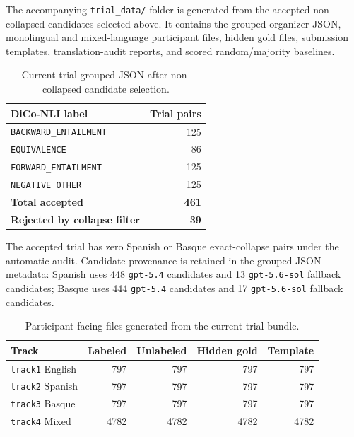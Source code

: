 \documentclass[10pt]{article}
\begin{document}
The accompanying \texttt{trial\_data/} folder is generated from the accepted
non-collapsed candidates selected above.  It contains the grouped organizer JSON,
monolingual and mixed-language participant files, hidden gold files, submission
templates, translation-audit reports, and scored random/majority baselines.

\begin{table}[h]
\centering
\small
\begin{tabular}{lr}
\toprule
DiCo-NLI label & Trial pairs \\
\midrule
\texttt{BACKWARD\_ENTAILMENT} & 125 \\
\texttt{EQUIVALENCE} & 86 \\
\texttt{FORWARD\_ENTAILMENT} & 125 \\
\texttt{NEGATIVE\_OTHER} & 125 \\
\midrule
\textbf{Total accepted} & \textbf{461} \\
\textbf{Rejected by collapse filter} & \textbf{39} \\
\bottomrule
\end{tabular}
\caption{Current trial grouped JSON after non-collapsed candidate selection.}
\label{tab:trial-counts}
\end{table}

The accepted trial has zero Spanish or Basque exact-collapse pairs under the
automatic audit.  Candidate provenance is retained in the grouped JSON metadata:
Spanish uses 448 \texttt{gpt-5.4} candidates and 13 \texttt{gpt-5.6-sol}
fallback candidates; Basque uses 444 \texttt{gpt-5.4} candidates and 17
\texttt{gpt-5.6-sol} fallback candidates.

\begin{table}[h]
\centering
\small
\begin{tabular}{lrrrr}
\toprule
Track & Labeled & Unlabeled & Hidden gold & Template \\
\midrule
\texttt{track1} English & 797 & 797 & 797 & 797 \\
\texttt{track2} Spanish & 797 & 797 & 797 & 797 \\
\texttt{track3} Basque & 797 & 797 & 797 & 797 \\
\texttt{track4} Mixed & 4782 & 4782 & 4782 & 4782 \\
\bottomrule
\end{tabular}
\caption{Participant-facing files generated from the current trial bundle.}
\label{tab:trial-files}
\end{table}
\end{document}
